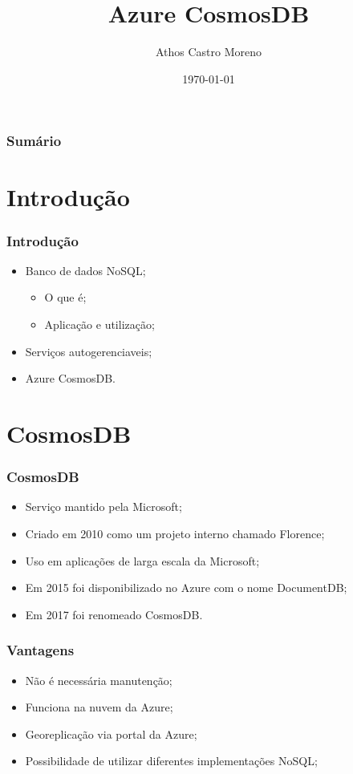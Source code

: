\documentclass{beamer}
\title{Azure CosmosDB}
\author[Athos Castro Moreno]{Athos Castro Moreno}
\institute{Universidade Tecnológica Federal do Paraná}
\date{\today}
\begin{document}
    \begin{frame}
        \titlepage
    \end{frame}
    \begin{frame}
        \frametitle{Sumário}
        \tableofcontents
    \end{frame}
    \section{Introdução}
    \begin{frame}
        \frametitle{Introdução}
        \begin{itemize}
             \item Banco de dados NoSQL;
             \begin{itemize}
                 \item O que é;
                 \item Aplicação e utilização;
             \end{itemize}
             \item Serviços autogerenciaveis;
             \item Azure CosmosDB.
        \end{itemize}
    \end{frame}
    \section{CosmosDB}
    \begin{frame}
        \frametitle{CosmosDB}
        \begin{itemize}
            \item Serviço mantido pela Microsoft;
            \item Criado em 2010 como um projeto interno chamado Florence;
            \item Uso em aplicações de larga escala da Microsoft;
            \item Em 2015 foi disponibilizado no Azure com o nome DocumentDB;
            \item Em 2017 foi renomeado CosmosDB.
        \end{itemize}
    \end{frame}
    \begin{frame}
        \frametitle{Vantagens}
        \begin{itemize}
            \item Não é necessária manutenção;
            \item Funciona na nuvem da Azure;
            \item Georeplicação via portal da Azure;
            \item Possibilidade de utilizar diferentes implementações NoSQL;
        \end{itemize}
    \end{frame}
\end{document}
